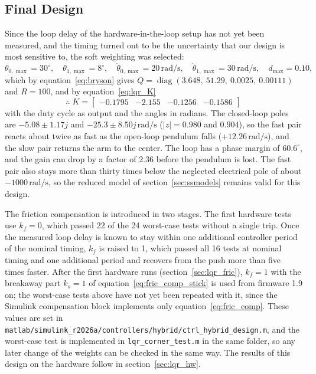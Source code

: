 \documentclass[a4paper,11pt]{article}
\begin{document}
\subsection{Final Design}
\label{sec:lqr_final}
Since the loop delay of the hardware-in-the-loop setup has not yet been measured, and the timing turned out to be the uncertainty that our design is most sensitive to, the soft weighting was selected:
\begin{equation}
  \theta_{0,\max} = 30^\circ,\quad \theta_{1,\max} = 8^\circ,\quad \dot\theta_{0,\max} = 20\,\mathrm{rad/s},\quad \dot\theta_{1,\max} = 30\,\mathrm{rad/s},\quad d_{\max} = 0.10 ,
\end{equation}
which by equation~\ref{eq:bryson} gives $Q = \operatorname{diag}(3.648,\ 51.29,\ 0.0025,\ 0.00111)$ and $R = 100$, and by equation~\ref{eq:lqr_K}
\begin{equation}
  \therefore\;\boxed{K = \begin{bmatrix} -0.1795 & -2.155 & -0.1256 & -0.1586 \end{bmatrix}}
  \label{eq:K_final}
\end{equation}
with the duty cycle as output and the angles in radians. The closed-loop poles are $-5.08 \pm 1.17j$ and $-25.3 \pm 8.50j\,\mathrm{rad/s}$ ($|z| = 0.980$ and $0.904$), so the fast pair reacts about twice as fast as the open-loop pendulum falls ($+12.26\,\mathrm{rad/s}$), and the slow pair returns the arm to the center. The loop has a phase margin of $60.6^\circ$, and the gain can drop by a factor of 2.36 before the pendulum is lost. The fast pair also stays more than thirty times below the neglected electrical pole of about $-1000\,\mathrm{rad/s}$, so the reduced model of section~\ref{sec:ssmodels} remains valid for this design.

The friction compensation is introduced in two stages. The first hardware tests use $k_f = 0$, which passed 22 of the 24 worst-case tests without a single trip. Once the measured loop delay is known to stay within one additional controller period of the nominal timing, $k_f$ is raised to 1, which passed all 16 tests at nominal timing and one additional period and recovers from the push more than five times faster. After the first hardware runs (section~\ref{sec:lqr_fric}), $k_f = 1$ with the breakaway part $k_s = 1$ of equation~\ref{eq:fric_comp_stick} is used from firmware 1.9 on; the worst-case tests above have not yet been repeated with it, since the Simulink compensation block implements only equation~\ref{eq:fric_comp}. These values are set in \nolinkurl{matlab/simulink_r2026a/controllers/hybrid/ctrl_hybrid_design.m}, and the worst-case test is implemented in \texttt{lqr\_corner\_test.m} in the same folder, so any later change of the weights can be checked in the same way. The results of this design on the hardware follow in section~\ref{sec:lqr_hw}.
\end{document}
